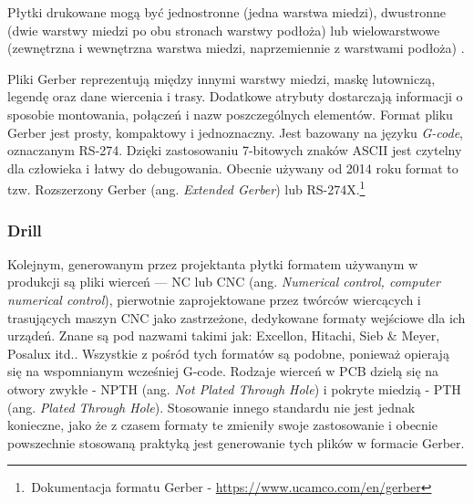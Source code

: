\documentclass{xmgr}
\begin{document}
Płytki drukowane mogą być jednostronne (jedna warstwa miedzi), dwustronne (dwie warstwy miedzi po obu stronach warstwy podłoża) lub wielowarstwowe (zewnętrzna i wewnętrzna warstwa miedzi, naprzemiennie z warstwami podłoża) \cite{schroeder}.

Pliki Gerber reprezentują między innymi warstwy miedzi, maskę lutowniczą, legendę oraz dane wiercenia i trasy. Dodatkowe atrybuty dostarczają informacji o sposobie montowania, połączeń i nazw poszczególnych elementów. Format pliku Gerber jest prosty, kompaktowy i jednoznaczny. Jest bazowany na języku \emph{G-code}, oznaczanym RS-274. Dzięki zastosowaniu 7-bitowych znaków ASCII jest czytelny dla człowieka i łatwy do debugowania. Obecnie używany od 2014 roku format to tzw. Rozszerzony Gerber (ang. \emph{Extended Gerber}) lub RS-274X.\footnote{\,Dokumentacja formatu Gerber - \url{https://www.ucamco.com/en/gerber}}

\subsubsection {Drill}
Kolejnym, generowanym przez projektanta płytki formatem używanym w produkcji są pliki wierceń --- NC lub CNC (ang. \emph{Numerical control, computer numerical control}), pierwotnie zaprojektowane przez twórców wiercących i trasujących maszyn CNC jako zastrzeżone, dedykowane formaty wejściowe dla ich urządeń. Znane są pod nazwami takimi jak: Excellon, Hitachi, Sieb \& Meyer, Posalux itd.\cite{Charras}. Wszystkie z pośród tych formatów są podobne, ponieważ opierają się na wspomnianym wcześniej G-code. Rodzaje wierceń w PCB dzielą się na otwory zwykłe - NPTH (ang. \emph{Not Plated Through Hole}) i pokryte miedzią - PTH (ang. \emph{Plated Through Hole})\cite{voldman}. Stosowanie innego standardu nie jest jednak konieczne, jako że z czasem formaty te zmieniły swoje zastosowanie i obecnie powszechnie stosowaną praktyką jest generowanie tych plików w formacie Gerber.
\end{document}
